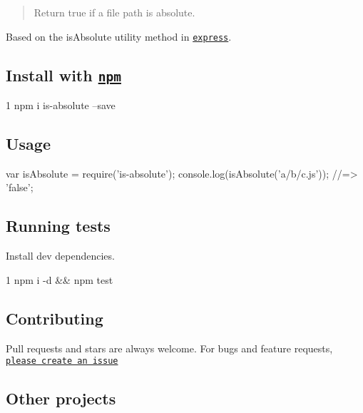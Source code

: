 \begin{quote}
Return true if a file path is absolute. \end{quote}


Based on the {\ttfamily is\+Absolute} utility method in \href{https://github.com/visionmedia/express}{\tt express}.

\subsection*{Install with \href{npmjs.org}{\tt npm}}


\begin{DoxyCode}
1 npm i is-absolute --save
\end{DoxyCode}


\subsection*{Usage}


\begin{DoxyCode}
var isAbsolute = require(\textcolor{stringliteral}{'is-absolute'});
console.log(isAbsolute(\textcolor{stringliteral}{'a/b/c.js'}));
\textcolor{comment}{//=> 'false';}
\end{DoxyCode}


\subsection*{Running tests}

Install dev dependencies.


\begin{DoxyCode}
1 npm i -d && npm test
\end{DoxyCode}


\subsection*{Contributing}

Pull requests and stars are always welcome. For bugs and feature requests, \href{https://github.com/jonschlinkert/is-absolute/issues}{\tt please create an issue}

\subsection*{Other projects}


